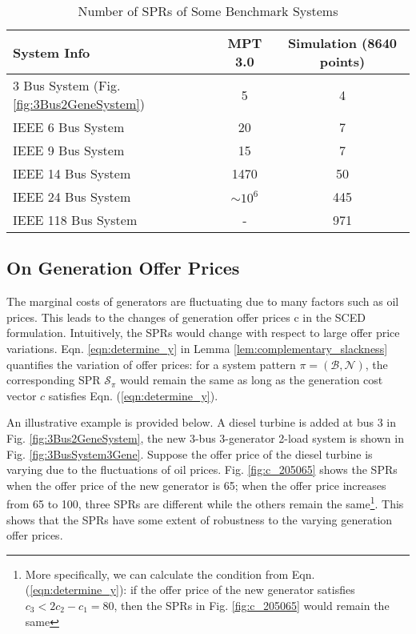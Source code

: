 \documentclass[letterpaper, 11pt]{article}
\theoremstyle{plain}
\theoremstyle{definition}
\begin{document}
\begin{table}[htbp]
  \caption{Number of SPRs of Some Benchmark Systems}
  \label{tab:number_spr}
  \centering

  \begin{tabular}{l|c|c}
  \hline

  \hline
  \textbf{System Info} & \textbf{MPT 3.0} & \textbf{Simulation (8640 points)} \\
  \hline
  3 Bus System (Fig.\ref{fig:3Bus2GeneSystem}) & 5 & 4 \\
  IEEE 6 Bus System & 20 & 7 \\
  IEEE 9 Bus System & 15 &  7\\
  IEEE 14 Bus System & 1470 & 50 \\
  IEEE 24 Bus System & $\sim 10^6$ & 445 \\
  IEEE 118 Bus System & - & 971 \\
\hline

  \hline
  \end{tabular}
\end{table}



\subsection{On Generation Offer Prices} \label{sub:on_generation_offer_prices}
The marginal costs of generators are fluctuating due to many factors such as oil prices. This leads to the changes of generation
offer prices c in the SCED formulation. Intuitively, the SPRs would change with respect to large offer price variations. Eqn. \ref{eqn:determine_y} in Lemma \ref{lem:complementary_slackness} quantifies the variation of offer prices: for a system pattern $\pi = (\mathcal{B}, \mathcal{N})$, the corresponding SPR $\mathcal{S}_{\pi}$  would remain the same as long as the generation cost vector $c$ satisfies Eqn. (\ref{eqn:determine_y}).

An illustrative example is provided below. A diesel turbine is added at bus 3 in Fig. \ref{fig:3Bus2GeneSystem}, the new 3-bus 3-generator 2-load system is shown in Fig. \ref{fig:3BusSystem3Gene}. Suppose the offer price of the diesel turbine is varying due to the fluctuations of oil prices. Fig. \ref{fig:c_205065} shows the SPRs when the offer price of the new
generator is 65; when the offer price increases from 65 to 100, three SPRs are different while the others remain the same\footnote{More specifically, we can calculate the condition from Eqn. (\ref{eqn:determine_y}): if the offer price of the new generator satisfies $c_3 < 2c_2 - c_1 = 80$, then the SPRs in Fig. \ref{fig:c_205065} would remain the same}.
This shows that the SPRs have some extent of robustness to the varying generation offer prices.
\end{document}
